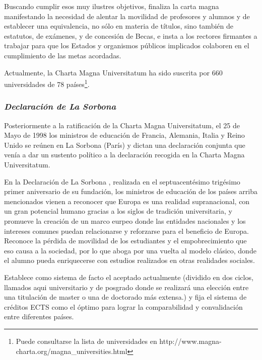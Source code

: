 		Buscando cumplir esos muy ilustres objetivos, finaliza la carta magna manifestando la necesidad de alentar la movilidad de profesores y alumnos y de establecer una equivalencia, no sólo en materia de títulos, sino también de estatutos, de exámenes, y de concesión de Becas, e insta a los rectores firmantes a trabajar para que los Estados y organismos públicos implicados colaboren en el cumplimiento de las metas acordadas.

		Actualmente, la Charta Magna Universitatum ha sido suscrita por 660 universidades de 78 países\footnote{Puede consultarse la lista de universidades en http://www.magna-charta.org/magna\_universities.html}. 

		\subsubsection{\bfseries \itshape Declaración de La Sorbona}
		Posteriormente a la ratificación de la Charta Magna Universitatum, el 25 de Mayo de 1998 los ministros de educación de Francia, Alemania, Italia y Reino Unido se	reúnen en La Sorbona (París) y dictan una declaración conjunta que venía a dar un sustento político a la declaración recogida en la Charta Magna Universitatum.

		En la Declaración de La Sorbona \cite{UNISOR:DS-98}, realizada en el septuacentésimo trigésimo primer aniversario de su fundación, los ministros de educación de los países arriba mencionados vienen a reconocer que Europa es una realidad supranacional, con un gran potencial humano gracias a los siglos de tradición universitaria, y promueve la creación de un marco eurpeo donde las entidades nacionales y los intereses comunes puedan relacionarse y reforzarse para el beneficio de Europa. Reconoce la pérdida de movilidad de los estudiantes y el empobrecimiento que eso causa a la sociedad, por lo que aboga por una vuelta al modelo clásico, donde el alumno pueda enriquecerse con estudios realizados en otras realidades sociales.

		Establece como sistema de facto el aceptado actualmente (dividido en dos ciclos, llamados aqui universitario y de posgrado donde se realizará una elección entre una titulación de master o una de doctorado más extensa.) y fija el sistema de créditos ECTS como el óptimo para lograr la comparabilidad y convalidación entre diferentes países. 

